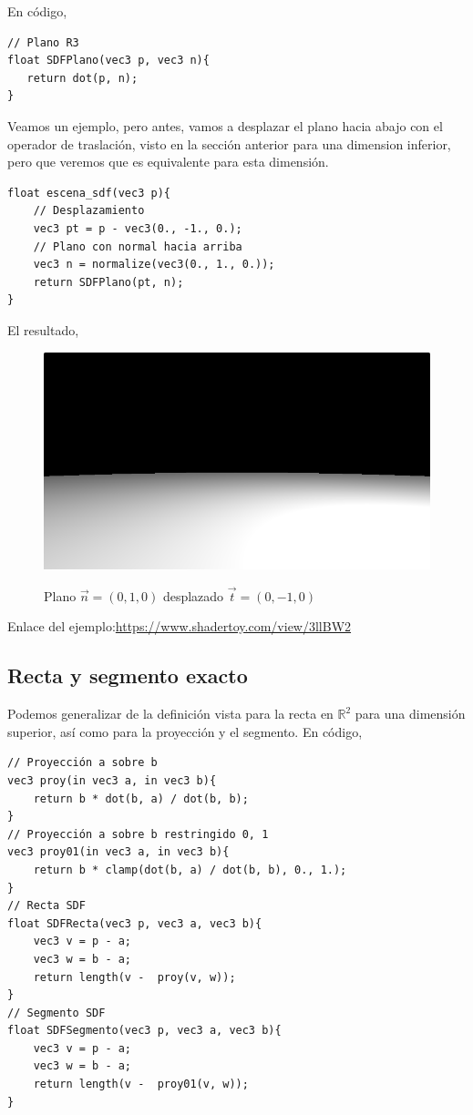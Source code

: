 En código,

\begin{lstlisting}
// Plano R3
float SDFPlano(vec3 p, vec3 n){
   return dot(p, n);
}
\end{lstlisting}

Veamos un ejemplo, pero antes, vamos a desplazar el plano hacia abajo con el operador de traslación, visto en la sección anterior para una dimension inferior, pero que veremos que es equivalente para esta dimensión.
\begin{lstlisting}
float escena_sdf(vec3 p){
    // Desplazamiento
    vec3 pt = p - vec3(0., -1., 0.);
    // Plano con normal hacia arriba
    vec3 n = normalize(vec3(0., 1., 0.));
    return SDFPlano(pt, n);
}
\end{lstlisting}

El resultado,

\begin{figure}[H]
  \centering
  \captionsetup{justification=centering}%
  \includegraphics[width=1.0\textwidth]{secciones/imagenes/sdf/3d/sdf_plano.png}\label{fig:plano}
  \caption{Plano \(\Vec{n}=(0,1,0)\) desplazado \(\Vec{t}=(0, -1, 0)\)}
\end{figure}

Enlace del ejemplo:\url{https://www.shadertoy.com/view/3llBW2}

\subsection{Recta y segmento exacto}

Podemos generalizar de la definición vista para la recta en \(\mathbb{R}^2\) para una dimensión superior, así como para la proyección y el segmento.
En código,
\begin{lstlisting}
// Proyección a sobre b
vec3 proy(in vec3 a, in vec3 b){
    return b * dot(b, a) / dot(b, b);
}
// Proyección a sobre b restringido 0, 1
vec3 proy01(in vec3 a, in vec3 b){
    return b * clamp(dot(b, a) / dot(b, b), 0., 1.);
}
// Recta SDF
float SDFRecta(vec3 p, vec3 a, vec3 b){
    vec3 v = p - a;
    vec3 w = b - a;
    return length(v -  proy(v, w));
}
// Segmento SDF
float SDFSegmento(vec3 p, vec3 a, vec3 b){
    vec3 v = p - a;
    vec3 w = b - a;
    return length(v -  proy01(v, w));
}
\end{lstlisting}

